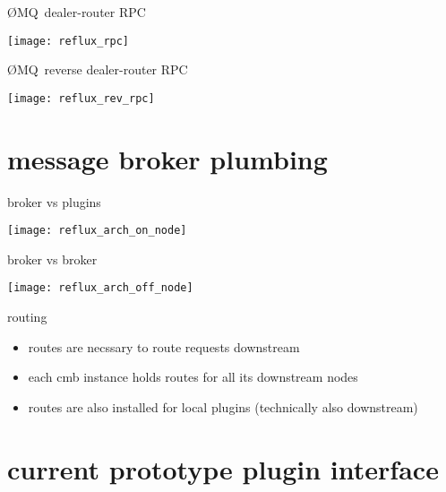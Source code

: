 \documentclass[default,pdf,colorBG,slideColor]{prosper}
\newcommand{\zMQ}{\O{}MQ}
\begin{document}
\begin{slide}{\zMQ\ dealer-router RPC}{\small
\begin{center}
  \texttt{[image: reflux\_rpc]}
\end{center}
}\end{slide}

\begin{slide}{\zMQ\ reverse dealer-router RPC}{\small
\begin{center}
  \texttt{[image: reflux\_rev\_rpc]}
\end{center}
}\end{slide}

\part{message broker plumbing}

\begin{slide}{broker vs plugins}{\small
\begin{center}
  \texttt{[image: reflux\_arch\_on\_node]}
\end{center}
}\end{slide}

\begin{slide}{broker vs broker}{\small
\begin{center}
  \texttt{[image: reflux\_arch\_off\_node]}
\end{center}
}\end{slide}

\begin{slide}{routing}{\small
\begin{itemize}
  \item{routes are necssary to route requests downstream}
  \item{each cmb instance holds routes for all its downstream nodes}
  \item{routes are also installed for local plugins
        (technically also downstream)}
\end{itemize}
}\end{slide}


\part{current prototype plugin interface}
\end{document}
